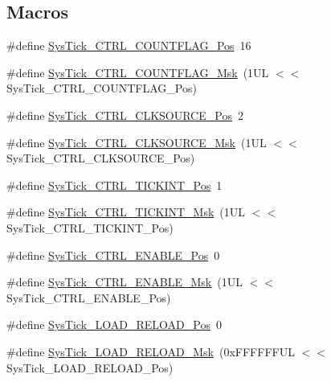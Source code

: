 \subsection*{Macros}
\begin{DoxyCompactItemize}
\item 
\#define \hyperlink{group___c_m_s_i_s___sys_tick_gadbb65d4a815759649db41df216ed4d60}{Sys\+Tick\+\_\+\+C\+T\+R\+L\+\_\+\+C\+O\+U\+N\+T\+F\+L\+A\+G\+\_\+\+Pos}~16
\item 
\#define \hyperlink{group___c_m_s_i_s___sys_tick_ga1bf3033ecccf200f59baefe15dbb367c}{Sys\+Tick\+\_\+\+C\+T\+R\+L\+\_\+\+C\+O\+U\+N\+T\+F\+L\+A\+G\+\_\+\+Msk}~(1\+U\+L $<$$<$ Sys\+Tick\+\_\+\+C\+T\+R\+L\+\_\+\+C\+O\+U\+N\+T\+F\+L\+A\+G\+\_\+\+Pos)
\item 
\#define \hyperlink{group___c_m_s_i_s___sys_tick_ga24fbc69a5f0b78d67fda2300257baff1}{Sys\+Tick\+\_\+\+C\+T\+R\+L\+\_\+\+C\+L\+K\+S\+O\+U\+R\+C\+E\+\_\+\+Pos}~2
\item 
\#define \hyperlink{group___c_m_s_i_s___sys_tick_gaa41d06039797423a46596bd313d57373}{Sys\+Tick\+\_\+\+C\+T\+R\+L\+\_\+\+C\+L\+K\+S\+O\+U\+R\+C\+E\+\_\+\+Msk}~(1\+U\+L $<$$<$ Sys\+Tick\+\_\+\+C\+T\+R\+L\+\_\+\+C\+L\+K\+S\+O\+U\+R\+C\+E\+\_\+\+Pos)
\item 
\#define \hyperlink{group___c_m_s_i_s___sys_tick_ga88f45bbb89ce8df3cd2b2613c7b48214}{Sys\+Tick\+\_\+\+C\+T\+R\+L\+\_\+\+T\+I\+C\+K\+I\+N\+T\+\_\+\+Pos}~1
\item 
\#define \hyperlink{group___c_m_s_i_s___sys_tick_ga95bb984266ca764024836a870238a027}{Sys\+Tick\+\_\+\+C\+T\+R\+L\+\_\+\+T\+I\+C\+K\+I\+N\+T\+\_\+\+Msk}~(1\+U\+L $<$$<$ Sys\+Tick\+\_\+\+C\+T\+R\+L\+\_\+\+T\+I\+C\+K\+I\+N\+T\+\_\+\+Pos)
\item 
\#define \hyperlink{group___c_m_s_i_s___sys_tick_ga0b48cc1e36d92a92e4bf632890314810}{Sys\+Tick\+\_\+\+C\+T\+R\+L\+\_\+\+E\+N\+A\+B\+L\+E\+\_\+\+Pos}~0
\item 
\#define \hyperlink{group___c_m_s_i_s___sys_tick_ga16c9fee0ed0235524bdeb38af328fd1f}{Sys\+Tick\+\_\+\+C\+T\+R\+L\+\_\+\+E\+N\+A\+B\+L\+E\+\_\+\+Msk}~(1\+U\+L $<$$<$ Sys\+Tick\+\_\+\+C\+T\+R\+L\+\_\+\+E\+N\+A\+B\+L\+E\+\_\+\+Pos)
\item 
\#define \hyperlink{group___c_m_s_i_s___sys_tick_gaf44d10df359dc5bf5752b0894ae3bad2}{Sys\+Tick\+\_\+\+L\+O\+A\+D\+\_\+\+R\+E\+L\+O\+A\+D\+\_\+\+Pos}~0
\item 
\#define \hyperlink{group___c_m_s_i_s___sys_tick_ga265912a7962f0e1abd170336e579b1b1}{Sys\+Tick\+\_\+\+L\+O\+A\+D\+\_\+\+R\+E\+L\+O\+A\+D\+\_\+\+Msk}~(0x\+F\+F\+F\+F\+F\+F\+U\+L $<$$<$ Sys\+Tick\+\_\+\+L\+O\+A\+D\+\_\+\+R\+E\+L\+O\+A\+D\+\_\+\+Pos)
$$
\end{DoxyCompactItemize}
